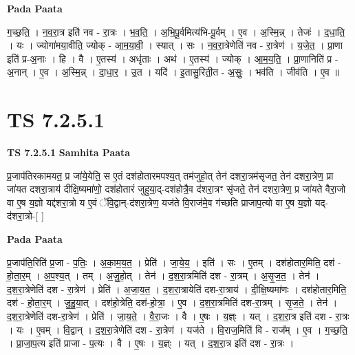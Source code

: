 \documentclass[17pt]{extarticle}
\begin{document}
\textbf{Pada Paata} \newline

ग॒च्छ॒ति॒ । न॒व॒रा॒त्र इति॑ नव - रा॒त्रः । भ॒व॒ति॒ । अ॒भि॒पू॒र्वमित्य॑भि-पू॒र्वम् । ए॒व । अ॒स्मि॒न्न् । तेजः॑ । द॒धा॒ति॒ । यः । ज्योगा॑मया॒वीति॒ ज्योक् - आ॒म॒या॒वी॒ । स्यात् । सः । न॒व॒रा॒त्रेणेति॑ नव - रा॒त्रेण॑ । य॒जे॒त॒ । प्रा॒णा इति॑ प्र-अ॒नाः । हि । वै । ए॒तस्य॑ । अधृ॑ताः । अथ॑ । ए॒तस्य॑ । ज्योक् । आ॒म॒य॒ति॒ । प्रा॒णानिति॑ प्र - अ॒नान् । ए॒व । अ॒स्मि॒न्न् । दा॒धा॒र॒ । उ॒त । यदि॑ । इ॒तासु॒रिती॒त - अ॒सुः॒ । भव॑ति । जीव॑ति । ए॒व ॥  \newline




\section*{ TS 7.2.5.1 }

\textbf{TS 7.2.5.1 } \newline
\textbf{Samhita Paata} \newline

प्र॒जाप॑तिरकामयत॒ प्र जा॑ये॒येति॒ स ए॒तं दश॑होतारमपश्य॒त् तम॑जुहो॒त् तेन॑ दशरा॒त्रम॑सृजत॒ तेन॑ दशरा॒त्रेण॒ प्रा जा॑यत दशरा॒त्राय॑ दीक्षि॒ष्यमा॑णो॒ दश॑होतारं जुहुया॒द्-दश॑होत्रै॒व द॑शरा॒त्रꣳ सृ॑जते॒ तेन॑ दशरा॒त्रेण॒ प्र जा॑यते वैरा॒जो वा ए॒ष य॒ज्ञो यद्द॑शरा॒त्रो य ए॒वं ॅवि॒द्वान्-द॑शरा॒त्रेण॒ यज॑ते वि॒राज॑मे॒व ग॑च्छति प्राजाप॒त्यो वा ए॒ष य॒ज्ञो यद्-द॑शरा॒त्रो-[  ] \newline

\textbf{Pada Paata} \newline

प्र॒जाप॑ति॒रिति॑ प्र॒जा - प॒तिः॒ । अ॒का॒म॒य॒त॒ । प्रेति॑ । जा॒ये॒य॒ । इति॑ । सः । ए॒तम् । दश॑होतार॒मिति॒ दश॑ - हो॒ता॒र॒म् । अ॒प॒श्य॒त् । तम् । अ॒जु॒हो॒त् । तेन॑ । द॒श॒रा॒त्रमिति॑ दश - रा॒त्रम् । अ॒सृ॒ज॒त॒ । तेन॑ । द॒श॒रा॒त्रेणेति॑ दश - रा॒त्रेण॑ । प्रेति॑ । अ॒जा॒य॒त॒ । द॒श॒रा॒त्रायेति॑ दश-रा॒त्राय॑ । दी॒क्षि॒ष्यमा॑णः । दश॑होतार॒मिति॒ दश॑ - हो॒ता॒र॒म् । जु॒हु॒या॒त् । दश॑हो॒त्रेति॒ दश॑-हो॒त्रा॒ । ए॒व । द॒श॒रा॒त्रमिति॑ दश-रा॒त्रम् । सृ॒ज॒ते॒ । तेन॑ । द॒श॒रा॒त्रेणेति॑ दश-रा॒त्रेण॑ । प्रेति॑ । जा॒य॒ते॒ । वै॒रा॒जः । वै । ए॒षः । य॒ज्ञ्ः । यत् । द॒श॒रा॒त्र इति॑ दश - रा॒त्रः । यः । ए॒वम् । वि॒द्वान् । द॒श॒रा॒त्रेणेति॑ दश - रा॒त्रेण॑ । यज॑ते । वि॒राज॒मिति॑ वि - राज᳚म् । ए॒व । ग॒च्छ॒ति॒ । प्रा॒जा॒प॒त्य इति॑ प्राजा - प॒त्यः । वै । ए॒षः । य॒ज्ञ्ः । यत् । द॒श॒रा॒त्र इति॑ दश - रा॒त्रः ।  \newline
\end{document}
